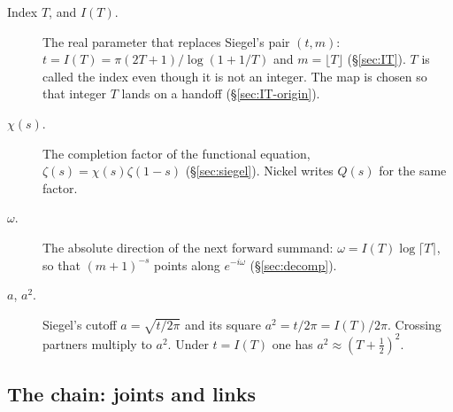 \documentclass[11pt]{article}
\theoremstyle{definition}
\begin{document}
\begin{description}
\item[Index $T$, and $I(T)$.]
The real parameter that replaces Siegel's pair $(t,m)$:
$t=I(T)=\pi(2T+1)/\log(1+1/T)$ and $m=\lfloor T\rfloor$
(\S\ref{sec:IT}).
$T$ is called the index even though it is not an integer.
The map is chosen so that integer $T$ lands on a handoff
(\S\ref{sec:IT-origin}).

\item[$\chi(s)$.]
The completion factor of the functional equation,
$\zeta(s)=\chi(s)\zeta(1-s)$
(\S\ref{sec:siegel}).
Nickel writes $Q(s)$ for the same factor.

\item[$\omega$.]
The absolute direction of the next forward summand:
$\omega=I(T)\log\lceil T\rceil$, so that $(m+1)^{-s}$ points along
$e^{-i\omega}$
(\S\ref{sec:decomp}).

\item[$a$, $a^{2}$.]
Siegel's cutoff $a=\sqrt{t/2\pi}$ and its square
$a^{2}=t/2\pi=I(T)/2\pi$.
Crossing partners multiply to $a^{2}$.
Under $t=I(T)$ one has $a^{2}\approx(T+\tfrac12)^{2}$.
\end{description}

\subsection*{The chain: joints and links}
\end{document}
